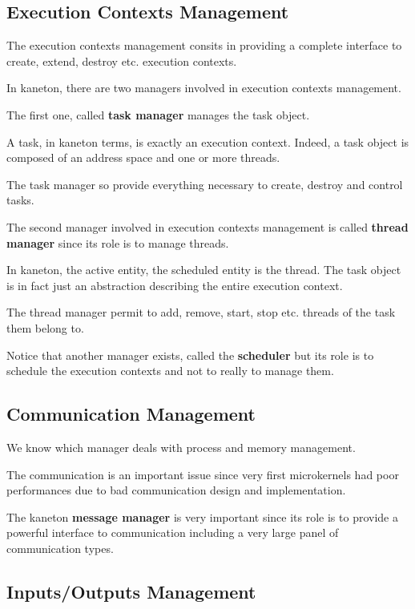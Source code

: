 \subsection{Execution Contexts Management}

The execution contexts management consits in providing a complete
interface to create, extend, destroy etc. execution contexts.

In kaneton, there are two managers involved in execution contexts
management.

The first one, called \textbf{task manager} manages the task object.

A task, in kaneton terms, is exactly an execution context. Indeed,
a task object is composed of an address space and one or more
threads.

The task manager so provide everything necessary to create, destroy
and control tasks.

The second manager involved in execution contexts management is called
\textbf{thread manager} since its role is to manage threads.

In kaneton, the active entity, the scheduled entity is the thread. The
task object is in fact just an abstraction describing the entire execution
context.

The thread manager permit to add, remove, start, stop etc. threads
of the task them belong to.

Notice that another manager exists, called the \textbf{scheduler} but
its role is to schedule the execution contexts and not to really to
manage them.

%
%

\subsection{Communication Management}

We know which manager deals with process and memory management.

The communication is an important issue since very first microkernels
had poor performances due to bad communication design and implementation.

The kaneton \textbf{message manager} is very important since its
role is to provide a powerful interface to communication including
a very large panel of communication types.

%
%

\subsection{Inputs/Outputs Management}

